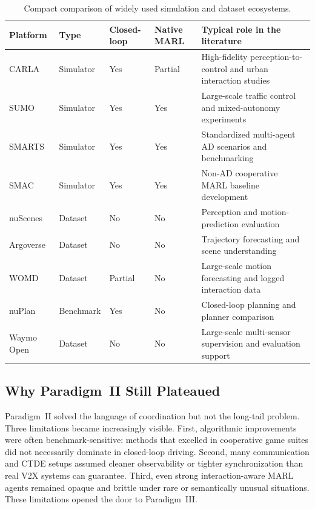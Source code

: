 \documentclass[12pt, a4paper]{article}
\begin{document}
\begin{table}[ht]
\centering
\caption{Compact comparison of widely used simulation and dataset ecosystems.
\label{tab:platforms}}
\renewcommand{\arraystretch}{1.15}
\small
\begin{tabular}{p{2.3cm}p{1.3cm}p{1.8cm}p{1.6cm}p{5.6cm}}
\toprule
\textbf{Platform} & \textbf{Type} & \textbf{Closed-loop} & \textbf{Native MARL} & \textbf{Typical role in the literature} \\
\midrule
CARLA \cite{dosovitskiy2017carlaopenurbandriving} & Simulator & Yes & Partial & High-fidelity perception-to-control and urban interaction studies \\
SUMO \cite{krajzewicz2012recent} & Simulator & Yes & Yes & Large-scale traffic control and mixed-autonomy experiments \\
SMARTS \cite{zhou2020smarts} & Simulator & Yes & Yes & Standardized multi-agent AD scenarios and benchmarking \\
SMAC \cite{samvelyan2019starcraft} & Simulator & Yes & Yes & Non-AD cooperative MARL baseline development \\
nuScenes \cite{caesar2020nuscenes} & Dataset & No & No & Perception and motion-prediction evaluation \\
Argoverse \cite{chang2019argoverse} & Dataset & No & No & Trajectory forecasting and scene understanding \\
WOMD \cite{ettinger2021large} & Dataset & Partial & No & Large-scale motion forecasting and logged interaction data \\
nuPlan \cite{caesar2021nuplan} & Benchmark & Yes & No & Closed-loop planning and planner comparison \\
Waymo Open \cite{waymo2021open} & Dataset & No & No & Large-scale multi-sensor supervision and evaluation support \\
\bottomrule
\end{tabular}
\end{table}

\subsection{Why Paradigm~II Still Plateaued}

Paradigm~II solved the language of coordination but not the long-tail problem.
Three limitations became increasingly visible. First, algorithmic improvements
were often benchmark-sensitive: methods that excelled in cooperative game suites
did not necessarily dominate in closed-loop driving. Second, many communication
and CTDE setups assumed cleaner observability or tighter synchronization than
real V2X systems can guarantee. Third, even strong interaction-aware MARL agents
remained opaque and brittle under rare or semantically unusual situations. These
limitations opened the door to Paradigm~III.
\end{document}
